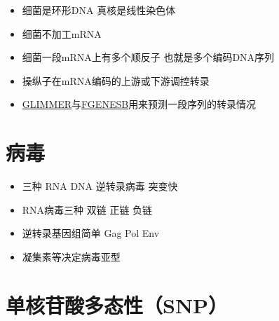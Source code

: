 \documentclass[
]{book}
\providecommand{\tightlist}{%
  \setlength{\itemsep}{0pt}\setlength{\parskip}{0pt}}
\begin{document}
\begin{itemize}
\tightlist
\item
  细菌是环形DNA 真核是线性染色体
\item
  细菌不加工mRNA
\item
  细菌一段mRNA上有多个顺反子 也就是多个编码DNA序列
\item
  操纵子在mRNA编码的上游或下游调控转录
\item
  \href{http://www.ncbi.nlm.nih.gov/genomes/MICROBES/glimmer_3.cgi}{GLIMMER}与\href{http://www.softberry.com/berry.phtml?topic=fgenesb\&group=programs\&subgroup=gfindb}{FGENESB}用来预测一段序列的转录情况
\end{itemize}

\hypertarget{ux75c5ux6bd2}{%
\section{病毒}\label{ux75c5ux6bd2}}

\begin{itemize}
\tightlist
\item
  三种 RNA DNA 逆转录病毒 突变快
\item
  RNA病毒三种 双链 正链 负链
\item
  逆转录基因组简单 Gag Pol Env
\item
  凝集素等决定病毒亚型
\end{itemize}

\hypertarget{ux5355ux6838ux82f7ux9178ux591aux6001ux6027snp}{%
\section{单核苷酸多态性（SNP）}\label{ux5355ux6838ux82f7ux9178ux591aux6001ux6027snp}}
\end{document}
